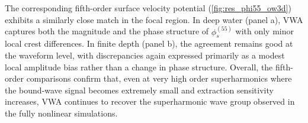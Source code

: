 \documentclass[lineno]{JFM-FLM_Au}
\begin{document}
The corresponding fifth-order surface velocity potential (\cref{fig:res_phi55_ow3d}) exhibits a similarly close match in the focal region. In deep water (panel a), VWA captures both the magnitude and the phase structure of $\phi_s^{(55)}$ with only minor local crest differences. In finite depth (panel b), the agreement remains good at the waveform level, with discrepancies again expressed primarily as a modest local amplitude bias rather than a change in phase structure. Overall, the fifth-order comparisons confirm that, even at very high order superharmonics where the bound-wave signal becomes extremely small and extraction sensitivity increases, VWA continues to recover the  superharmonic wave group observed in the fully nonlinear simulations.









\end{document}
